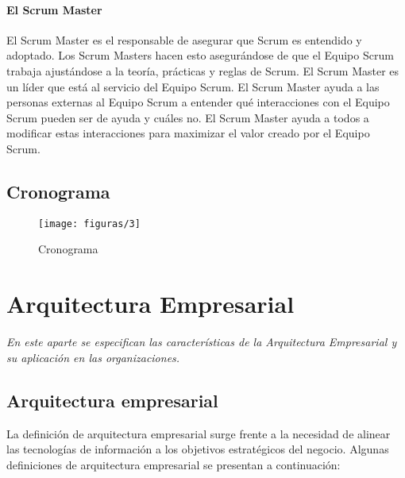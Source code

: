   \subsubsection{El Scrum Master}
  El Scrum Master es el responsable de asegurar que Scrum es entendido y adoptado. Los Scrum Masters hacen esto asegurándose de que el Equipo Scrum trabaja ajustándose a la teoría, prácticas y reglas de Scrum. El Scrum Master es un líder que está al servicio del Equipo Scrum. El Scrum Master ayuda a las personas externas al Equipo Scrum a entender qué interacciones con el Equipo Scrum pueden ser de ayuda y cuáles no. El Scrum Master ayuda a todos a modificar estas interacciones para maximizar el valor creado por el Equipo Scrum.

\section{Cronograma}
  \begin{figure}[H]
  	\centering
  	\texttt{[image: figuras/3]}
  	\captionsetup{width=.95\textwidth}
  	\caption{Cronograma}
  	\label{figura3}
  \end{figure}

\chapter{Arquitectura Empresarial}
\label{chap:aEmpresarial}
\textit{En este aparte se especifican  las características de la Arquitectura Empresarial y su aplicación en las organizaciones.}
\vfill
\minitoc
\cleardoublepage

\section{Arquitectura empresarial}
La definición de arquitectura empresarial surge frente a la necesidad de alinear las tecnologías de información a los objetivos estratégicos del negocio. \cite{ref1} Algunas definiciones de arquitectura empresarial se presentan a continuación:
  
